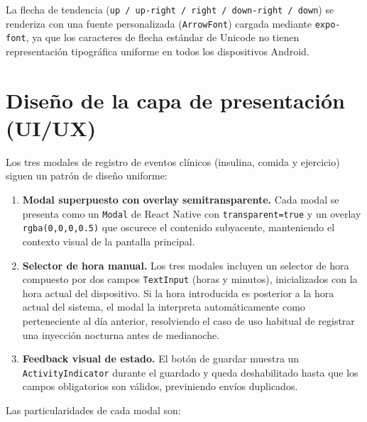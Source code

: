 La flecha de tendencia (\texttt{up / up-right / right / down-right / down}) se renderiza con una fuente
personalizada (\texttt{ArrowFont}) cargada mediante \texttt{expo-font}, ya que los
caracteres de flecha estándar de Unicode no tienen representación tipográfica uniforme
en todos los dispositivos Android.

\section{Diseño de la capa de presentación (UI/UX)}
\label{sec:diseno-modales}

Los tres modales de registro de eventos clínicos (insulina, comida y ejercicio) siguen
un patrón de diseño uniforme:

\begin{enumerate}
    \item \textbf{Modal superpuesto con overlay semitransparente.} Cada modal se
          presenta como un \texttt{Modal} de React Native con \texttt{transparent=true}
          y un overlay \texttt{rgba(0,0,0,0.5)} que oscurece el contenido subyacente,
          manteniendo el contexto visual de la pantalla principal.

    \item \textbf{Selector de hora manual.} Los tres modales incluyen un selector
          de hora compuesto por dos campos \texttt{TextInput} (horas y minutos),
          inicializados con la hora actual del dispositivo. Si la hora introducida
          es posterior a la hora actual del sistema, el modal la interpreta
          automáticamente como perteneciente al día anterior, resolviendo el caso
          de uso habitual de registrar una inyección nocturna antes de medianoche.

    \item \textbf{Feedback visual de estado.} El botón de guardar muestra un
          \texttt{ActivityIndicator} durante el guardado y queda deshabilitado
          hasta que los campos obligatorios son válidos, previniendo envíos duplicados.
\end{enumerate}

Las particularidades de cada modal son:

